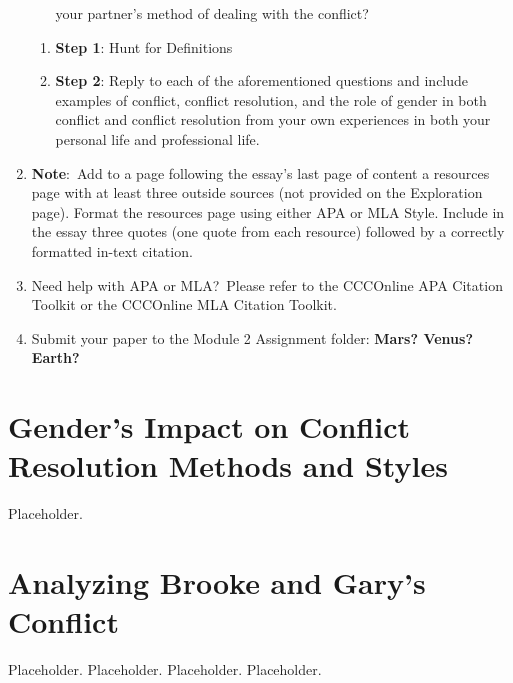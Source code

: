 \documentclass[stu,12pt]{apa7}
\begin{document}
\begin{enumerate}
\begin{itemize}
            your partner's method of dealing with the conflict?
        \end{itemize}
        \begin{enumerate}
          \item \textbf{Step 1}: Hunt for Definitions
          \item \textbf{Step 2}: Reply to each of the aforementioned questions
            and include examples of conflict, conflict resolution, and the role
            of gender in both conflict and conflict resolution from your own
            experiences in both your personal life and professional life.
        \end{enumerate}
      \item \textbf{Note}:\ Add to a page following the essay's last page of
        content a resources page with at least three outside sources (not
        provided on the Exploration page). Format the resources page using
        either APA or MLA Style. Include in the essay three quotes (one quote
        from each resource) followed by a correctly formatted in-text citation.
      \item Need help with APA or MLA?\ Please refer to the CCCOnline APA
        Citation Toolkit or the CCCOnline MLA Citation Toolkit.
      \item Submit your paper to the Module 2 Assignment folder:
        \textbf{Mars? Venus? Earth?}
    \end{enumerate}


  \newpage
  \section{Gender's Impact on Conflict Resolution Methods and Styles}
    Placeholder.

  \section{Analyzing Brooke and Gary's Conflict}
    Placeholder.
    Placeholder.
    Placeholder.
    Placeholder.



  \newpage
  \nocite{*}
  \printbibliography[%
    title={Works Consulted},%
    heading={bibintoc},%
    category={consulted}%
  ]
\end{document}
